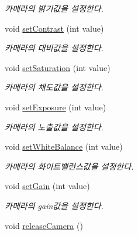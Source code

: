 \begin{DoxyCompactItemize}
\begin{DoxyCompactList}\small\item\em 카메라의 밝기값을 설정한다. \end{DoxyCompactList}\item 
\hypertarget{class_fk_camera_af7501a82e4da33d3a531dda1ec069fcc}{}void \hyperlink{class_fk_camera_af7501a82e4da33d3a531dda1ec069fcc}{set\+Contrast} (int value)\label{class_fk_camera_af7501a82e4da33d3a531dda1ec069fcc}

\begin{DoxyCompactList}\small\item\em 카메라의 대비값을 설정한다. \end{DoxyCompactList}\item 
\hypertarget{class_fk_camera_ae9b9b79dc91cdb4ff44f0f3c523ac274}{}void \hyperlink{class_fk_camera_ae9b9b79dc91cdb4ff44f0f3c523ac274}{set\+Saturation} (int value)\label{class_fk_camera_ae9b9b79dc91cdb4ff44f0f3c523ac274}

\begin{DoxyCompactList}\small\item\em 카메라의 채도값을 설정한다. \end{DoxyCompactList}\item 
\hypertarget{class_fk_camera_a6cfadb0f43f9ba5ac985f2a165f7e6c4}{}void \hyperlink{class_fk_camera_a6cfadb0f43f9ba5ac985f2a165f7e6c4}{set\+Exposure} (int value)\label{class_fk_camera_a6cfadb0f43f9ba5ac985f2a165f7e6c4}

\begin{DoxyCompactList}\small\item\em 카메라의 노출값을 설정한다. \end{DoxyCompactList}\item 
\hypertarget{class_fk_camera_a8d9941c78aac38812272142b8bc31d74}{}void \hyperlink{class_fk_camera_a8d9941c78aac38812272142b8bc31d74}{set\+White\+Balance} (int value)\label{class_fk_camera_a8d9941c78aac38812272142b8bc31d74}

\begin{DoxyCompactList}\small\item\em 카메라의 화이트밸런스값을 설정한다. \end{DoxyCompactList}\item 
\hypertarget{class_fk_camera_a95379b411e9e14bf6101b5cc0064f3a2}{}void \hyperlink{class_fk_camera_a95379b411e9e14bf6101b5cc0064f3a2}{set\+Gain} (int value)\label{class_fk_camera_a95379b411e9e14bf6101b5cc0064f3a2}

\begin{DoxyCompactList}\small\item\em 카메라의 gain값을 설정한다. \end{DoxyCompactList}\item 
\hypertarget{class_fk_camera_a728109badc3280b255dd82508adde6e6}{}void \hyperlink{class_fk_camera_a728109badc3280b255dd82508adde6e6}{release\+Camera} ()\label{class_fk_camera_a728109badc3280b255dd82508adde6e6}


\end{DoxyCompactItemize}
